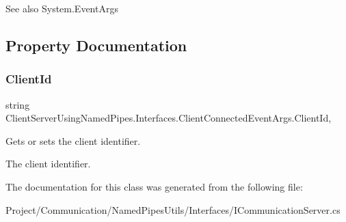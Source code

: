 \begin{DoxySeeAlso}{See also}
System.\+Event\+Args


\end{DoxySeeAlso}


\subsection{Property Documentation}
\mbox{\label{class_client_server_using_named_pipes_1_1_interfaces_1_1_client_connected_event_args_a7b9634a42796e554e65e6de7256aa6ed}} 
\subsubsection{\texorpdfstring{Client\+Id}{ClientId}}
{\footnotesize\ttfamily string Client\+Server\+Using\+Named\+Pipes.\+Interfaces.\+Client\+Connected\+Event\+Args.\+Client\+Id\hspace{0.3cm}{\ttfamily [get]}, {\ttfamily [set]}}



Gets or sets the client identifier. 

The client identifier.

The documentation for this class was generated from the following file\+:\begin{DoxyCompactItemize}
\item 
Project/\+Communication/\+Named\+Pipes\+Utils/\+Interfaces/I\+Communication\+Server.\+cs\end{DoxyCompactItemize}

